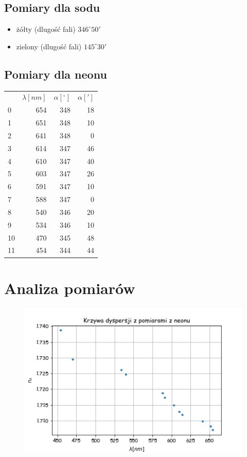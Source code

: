 \documentclass[a4paper,10pt]{article}
\begin{document}
\subsection{Pomiary dla sodu}
\begin{itemize}
  \item żółty (dlugość fali) $346^\circ 50'$ %
  \item zielony (dlugość fali) $145^\circ 30'$ %
\end{itemize}
\subsection{Pomiary dla neonu}
\begin{tabular}{lrrr}
{} &  $\lambda[nm]$ &  $\alpha[^\circ]$ &  $\alpha[']$ \\
0  &         654 &          348 &          18 \\
1  &         651 &          348 &          10 \\
2  &         641 &          348 &           0 \\
3  &         614 &          347 &          46 \\
4  &         610 &          347 &          40 \\
5  &         603 &          347 &          26 \\
6  &         591 &          347 &          10 \\
7  &         588 &          347 &           0 \\
8  &         540 &          346 &          20 \\
9  &         534 &          346 &          10 \\
10 &         470 &          345 &          48 \\
11 &         454 &          344 &          44 \\
\end{tabular}

\section{Analiza pomiarów}
\begin{figure} [H]
  \includegraphics{./dyspersja.png}
  \caption{}
  \label{}
\end{figure}
\end{document}
